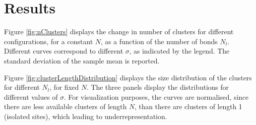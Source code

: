 \section{Results}

%
%
%


Figure \ref{fig:nClusters} displays the change in number of clusters for different configurations, for a constant $N$, as a function of the number of bonds $N_l.$ Different curves correspond to different  $\sigma$, as indicated by the legend. The standard deviation of the sample mean is reported.

Figure \ref{fig:clusterLengthDistribution} displays the size distribution of the clusters for different $N_l$, for fixed $N.$ The three panels display the distributions for different values of  $\sigma.$ For visualization purposes, the curves are normalised, since there are less available clusters of length  $N$,  than there are clusters of length 1 (isolated sites), which leading to underrepresentation.

